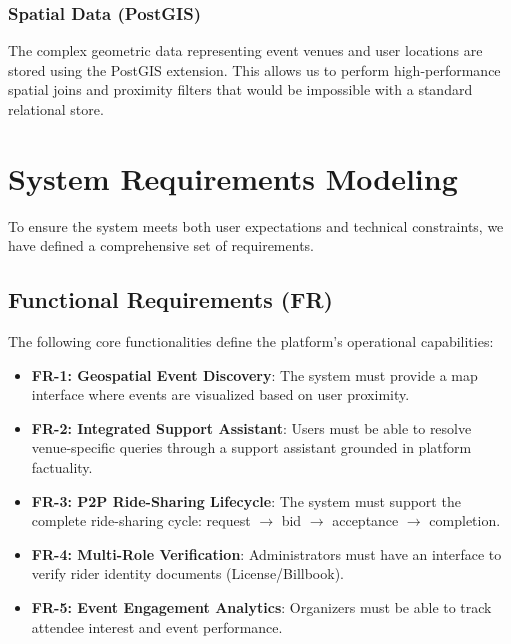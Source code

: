 \subsubsection{Spatial Data (PostGIS)}
The complex geometric data representing event venues and user locations are stored using the PostGIS extension. This allows us to perform high-performance spatial joins and proximity filters that would be impossible with a standard relational store.

\section{System Requirements Modeling}
To ensure the system meets both user expectations and technical constraints, we have defined a comprehensive set of requirements.

\subsection{Functional Requirements (FR)}
The following core functionalities define the platform's operational capabilities:
\begin{itemize}
    \item \textbf{FR-1: Geospatial Event Discovery}: The system must provide a map interface where events are visualized based on user proximity.
    \item \textbf{FR-2: Integrated Support Assistant}: Users must be able to resolve venue-specific queries through a support assistant grounded in platform factuality.
    \item \textbf{FR-3: P2P Ride-Sharing Lifecycle}: The system must support the complete ride-sharing cycle: request $\rightarrow$ bid $\rightarrow$ acceptance $\rightarrow$ completion.
    \item \textbf{FR-4: Multi-Role Verification}: Administrators must have an interface to verify rider identity documents (License/Billbook).
    \item \textbf{FR-5: Event Engagement Analytics}: Organizers must be able to track attendee interest and event performance.
\end{itemize}

